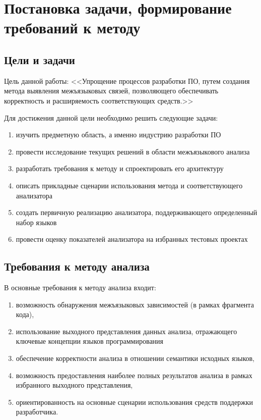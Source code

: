 \section{Постановка задачи, формирование требований к методу}

\subsection{Цели и задачи}

Цель данной работы: <<Упрощение процессов разработки ПО, путем создания метода выявления межъязыковых связей,
позволяющего обеспечивать корректность и расширяемость соответствующих средств.>>

Для достижения данной цели необходимо решить следующие задачи:
\begin{enumerate}[label=\arabic*.]
    \item изучить предметную область, а именно индустрию разработки ПО
    \item провести исследование текущих решений в области межъязыкового анализа
    \item разработать требования к методу и спроектировать его архитектуру
    \item описать прикладные сценарии использования метода и соответствующего анализатора
    \item создать первичную реализацию анализатора, поддерживающего определенный набор языков
    \item провести оценку показателей анализатора на избранных тестовых проектах
\end{enumerate}


\subsection{Требования к методу анализа}

В основные требования к методу анализа входит:
\begin{enumerate}[label=\arabic*.]
    \item возможность обнаружения межъязыковых зависимостей (в рамках фрагмента кода),
    \item использование выходного представления данных анализа, отражающего ключевые концепции
    языков программирования
    \item обеспечение корректности анализа в отношении семантики исходных языков,
    \item возможность предоставления наиболее полных результатов анализа в рамках
    избранного выходного представления,
    \item ориентированность на основные сценарии использования средств
    поддержки разработчика.
\end{enumerate}

